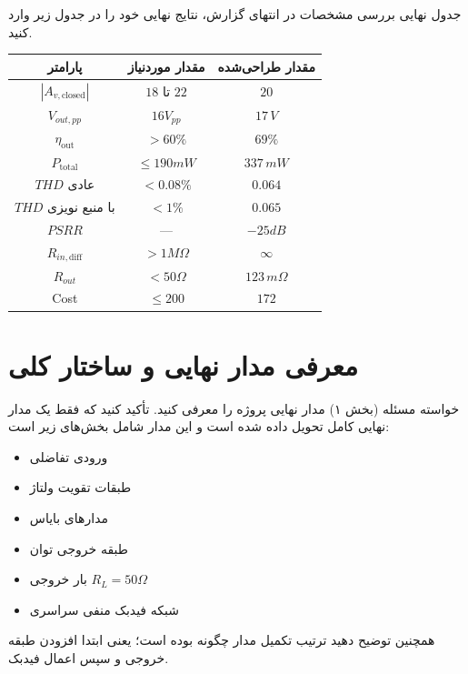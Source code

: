 \documentclass[12pt,a4paper]{article}
\begin{document}
\begin{answerbox}{جدول نهایی بررسی مشخصات}
در انتهای گزارش، نتایج نهایی خود را در جدول زیر وارد کنید.
\begin{center}
\begin{tabular}{|c|c|c|}
\hline
\textbf{پارامتر} & \textbf{مقدار موردنیاز} & \textbf{مقدار طراحی‌شده} \\
\hline
$|A_{v,\text{closed}}|$ & $18$ تا $22$ & $20$\\
\hline
$V_{out,pp}$ & $16V_{pp}$ & $17\, V$ \\
\hline
$\eta_{\text{out}}$ & $>60\%$ & $69\%$\\
\hline
$P_{\text{total}}$ & $\le 190mW$ &$337\, mW$ \\
\hline
$THD$ عادی & $<0.08\%$ & $0.064$ \\
\hline
$THD$ با منبع نویزی & $<1\%$ &$0.065$ \\
\hline
$PSRR$ & --- & $-25 dB$\\
\hline
$R_{in,\text{diff}}$ & $>1M\Omega$ & $\infty$ \\
\hline
$R_{out}$ & $<50\Omega$ & $123\, m\Omega$ \\
\hline
Cost & $\le 200$ & $172$\\
\hline
\end{tabular}
\end{center}
\end{answerbox}

\newpage

\section{معرفی مدار نهایی و ساختار کلی}

\begin{taskbox}{خواسته مسئله (بخش ۱)}
مدار نهایی پروژه را معرفی کنید. تأکید کنید که فقط یک مدار نهایی کامل تحویل داده شده است و این مدار شامل بخش‌های زیر است:
\begin{itemize}
    \item ورودی تفاضلی
    \item طبقات تقویت ولتاژ
    \item مدارهای بایاس
    \item طبقه خروجی توان
    \item بار خروجی $R_L=50\Omega$
    \item شبکه فیدبک منفی سراسری
\end{itemize}
همچنین توضیح دهید ترتیب تکمیل مدار چگونه بوده است؛ یعنی ابتدا افزودن طبقه خروجی و سپس اعمال فیدبک.
\end{taskbox}
\end{document}
